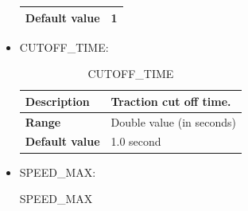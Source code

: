 \documentclass{template/openetcs}
\begin{document}
\begin{itemize}
\begin{longtable}{|l|l|}
				\hline
				
					\begin{minipage}[t]{0.22\linewidth} \textbf{Default value}	\end{minipage} 
				&	\begin{minipage}[t]{0.78\linewidth} 1 \end{minipage} \\
				
				\hline
				
			\end{longtable}
			
		\item CUTOFF\_TIME:
																					
			\begin{longtable}{|l|l|}
				\caption{CUTOFF\_TIME}\\ 
				\hline
				
					\begin{minipage}[t]{0.22\linewidth} \textbf{Description}	\end{minipage} 
				&	\begin{minipage}[t]{0.78\linewidth} Traction cut off time. \end{minipage} \\
				
				\hline
																																									
					\begin{minipage}[t]{0.22\linewidth} \textbf{Range}	\end{minipage} 
				&	\begin{minipage}[t]{0.78\linewidth} Double value (in seconds) \end{minipage} \\
				
				\hline
				
					\begin{minipage}[t]{0.22\linewidth} \textbf{Default value}	\end{minipage} 
				&	\begin{minipage}[t]{0.78\linewidth} 1.0 second \end{minipage} \\
				
				\hline
				
			\end{longtable}
			
		\item SPEED\_MAX:
																							
			\begin{longtable}{|l|l|}
				\caption{SPEED\_MAX}\\ 
				\hline
				

\end{longtable}
\end{itemize}
\end{document}
